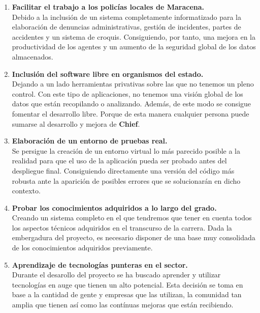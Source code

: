 \begin{enumerate}

    \item \textbf{Facilitar el trabajo a los policías locales de Maracena.}\\
    Debido a la inclusión de un sistema completamente informatizado para la elaboración de 
    denuncias administrativas, gestión de incidentes, partes de accidentes y un sistema de croquis. Consiguiendo,
    por tanto, una mejora en la productividad de los agentes y un aumento de la seguridad
    global de los datos almacenados.
    
    \item \textbf{Inclusión del software libre en organismos del estado.}\\
    Dejando a un lado herramientas privativas sobre las que no tenemos un pleno control. Con este tipo de aplicaciones, no tenemos una visión global
    de los datos que están recopilando o analizando. Además, de este modo se consigue fomentar el desarrollo libre. Porque 
    de esta manera cualquier persona puede sumarse al desarrollo y mejora de \textbf{Chief}.

    \item \textbf{Elaboración de un entorno de pruebas real.}\\
    Se persigue la creación de un entorno virtual lo más parecido posible a la 
    realidad para que el uso de la aplicación pueda ser probado antes del despliegue 
    final. Consiguiendo directamente una versión del código más robusta ante la aparición de posibles errores que se solucionarán en dicho contexto.
   	
    \item \textbf{Probar los conocimientos adquiridos a lo largo del grado.}\\
    Creando un sistema completo en el que tendremos que tener en cuenta todos los 
    aspectos técnicos adquiridos en el transcurso de la carrera. Dada la embergadura del
    proyecto, es necesario disponer de una base muy consolidada de los conocimientos adquiridos
    previamente.

    \item \textbf{Aprendizaje de tecnologías punteras en el sector.}\\
    Durante el desarollo del proyecto se ha buscado aprender y utilizar tecnologías en 
    auge que tienen un alto potencial. Esta decisión se toma en base  a la cantidad de gente
    y empresas que las utilizan, la comunidad tan amplia que tienen así como las contínuas
    mejoras que están recibiendo.  

\end{enumerate}

